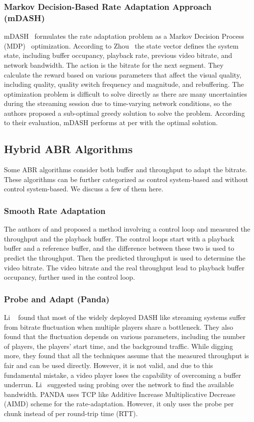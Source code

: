 \subsubsection{Markov Decision-Based Rate Adaptation Approach (mDASH)}
mDASH~\cite{7393865} formulates the rate adaptation problem as a Markov Decision Process (MDP)~\cite{P-1066} optimization. According to Zhou \etal\, the state vector defines the system state, including buffer occupancy, playback rate, previous video bitrate, and network bandwidth. The action is the bitrate for the next segment. They calculate the reward based on various parameters that affect the visual quality, including quality, quality switch frequency and magnitude, and rebuffering. The optimization problem is difficult to solve directly as there are many uncertainties during the streaming session due to time-varying network conditions, so the authors proposed a sub-optimal greedy solution to solve the problem. According to their evaluation, mDASH performs at per with the optimal solution.

\subsection{Hybrid ABR Algorithms}
Some ABR algorithms consider both buffer and throughput to adapt the bitrate. These algorithms can be further categorized as control system-based and without control system-based. We discuss a few of them here.

\subsubsection{Smooth Rate Adaptation}
The authors of \cite{10.1145/2413176.2413190} and \cite{6694183} proposed a method involving a control loop and measured the throughput and the playback buffer. The control loops start with a playback buffer and a reference buffer, and the difference between these two is used to predict the throughput. Then the predicted throughput is used to determine the video bitrate. The video bitrate and the real throughput lead to playback buffer occupancy, further used in the control loop.

\subsubsection{Probe and Adapt (Panda)}
Li \etal~\cite{140405} found that most of the widely deployed DASH like streaming systems suffer from bitrate fluctuation when multiple players share a bottleneck. They also found that the fluctuation depends on various parameters, including the number of players, the players' start time, and the background traffic. While digging more, they found that all the techniques assume that the measured throughput is fair and can be used directly. However, it is not valid, and due to this fundamental mistake, a video player loses the capability of overcoming a buffer underrun. Li \etal\ suggested using probing over the network to find the available bandwidth. PANDA uses TCP like Additive Increase Multiplicative Decrease (AIMD) scheme for the rate-adaptation. However, it only uses the probe per chunk instead of per round-trip time (RTT).


